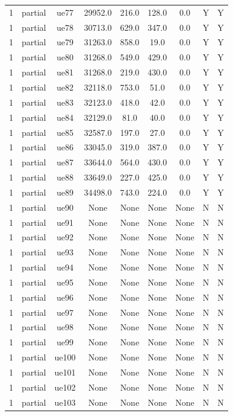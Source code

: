 \begin{table}[ht]
\begin{tabular}{|c|c|c|c|c|c|c|c|c|}
1 & partial & ue77 & 29952.0 & 216.0 & 128.0 & 0.0 & Y & Y \\
1 & partial & ue78 & 30713.0 & 629.0 & 347.0 & 0.0 & Y & Y \\
1 & partial & ue79 & 31263.0 & 858.0 & 19.0 & 0.0 & Y & Y \\
1 & partial & ue80 & 31268.0 & 549.0 & 429.0 & 0.0 & Y & Y \\
1 & partial & ue81 & 31268.0 & 219.0 & 430.0 & 0.0 & Y & Y \\
1 & partial & ue82 & 32118.0 & 753.0 & 51.0 & 0.0 & Y & Y \\
1 & partial & ue83 & 32123.0 & 418.0 & 42.0 & 0.0 & Y & Y \\
1 & partial & ue84 & 32129.0 & 81.0 & 40.0 & 0.0 & Y & Y \\
1 & partial & ue85 & 32587.0 & 197.0 & 27.0 & 0.0 & Y & Y \\
1 & partial & ue86 & 33045.0 & 319.0 & 387.0 & 0.0 & Y & Y \\
1 & partial & ue87 & 33644.0 & 564.0 & 430.0 & 0.0 & Y & Y \\
1 & partial & ue88 & 33649.0 & 227.0 & 425.0 & 0.0 & Y & Y \\
1 & partial & ue89 & 34498.0 & 743.0 & 224.0 & 0.0 & Y & Y \\
1 & partial & ue90 & None & None & None & None & N & N \\
1 & partial & ue91 & None & None & None & None & N & N \\
1 & partial & ue92 & None & None & None & None & N & N \\
1 & partial & ue93 & None & None & None & None & N & N \\
1 & partial & ue94 & None & None & None & None & N & N \\
1 & partial & ue95 & None & None & None & None & N & N \\
1 & partial & ue96 & None & None & None & None & N & N \\
1 & partial & ue97 & None & None & None & None & N & N \\
1 & partial & ue98 & None & None & None & None & N & N \\
1 & partial & ue99 & None & None & None & None & N & N \\
1 & partial & ue100 & None & None & None & None & N & N \\
1 & partial & ue101 & None & None & None & None & N & N \\
1 & partial & ue102 & None & None & None & None & N & N \\
1 & partial & ue103 & None & None & None & None & N & N \\

\end{tabular}
\end{table}

